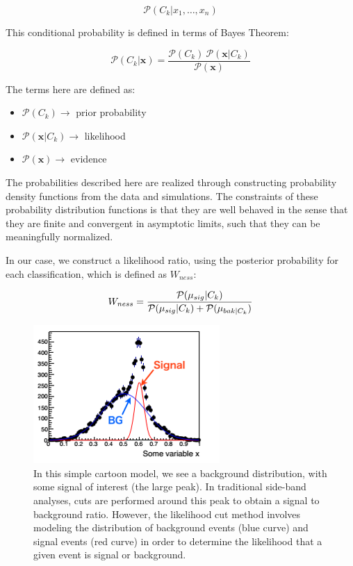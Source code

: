 \begin{equation}
	\label{eq:cond_probabilty}
  \mathcal{P}(C_k \vert x_1, \dots, x_n)
\end{equation}

This conditional probability is defined in terms of Bayes Theorem:

\begin{equation}
	\label{eq:bayes_theorm}
  \mathcal{P}(C_k \vert \mathbf{x}) = \frac{\mathcal{P}(C_k) \
  \mathcal{P}(\mathbf{x} \vert C_k)}{\mathcal{P}(\mathbf{x})}
\end{equation}

The terms here are defined as:
\begin{itemize}
  \item $\mathcal{P}(C_k)\rightarrow$ prior probability
	\item $\mathcal{P}(\mathbf{x} \vert C_k)\rightarrow$ likelihood
	\item $\mathcal{P}(\mathbf{x})\rightarrow$ evidence
\end{itemize}

The probabilities described here are realized through constructing probability
density functions from the data and simulations. The constraints of these
probability distribution functions is that they are well behaved in the sense
that they are finite and convergent in asymptotic limits, such that they can be
meaningfully normalized.

In our case, we construct a likelihood ratio, using the posterior probability
for each classification, which is defined as $W_{ness}$:

\begin{equation}
  W_{ness} = { 
  {
    \mathcal{P}(\mu_{sig}\vert C_k)} 
    \over 
    {\mathcal{P}(\mu_{sig}\vert C_k)+\mathcal{P}(\mu_{bak\vert C_k})} 
  }
\end{equation}

\begin{figure}[ht]
  \centering
  \includegraphics[width=0.6\linewidth]{./figures/likelihood_event_selection.png}
  \caption{
    In this simple cartoon model, we see a background distribution, with some
    signal of interest (the large peak). In traditional side-band analyses, cuts
    are performed around this peak to obtain a signal to background ratio.
    However, the likelihood cut method involves modeling the distribution of
    background events (blue curve) and signal events (red curve) in order to
    determine the likelihood that a given event is signal or background.
  }
  \label{fig:simple_likelihood_event_selection}
\end{figure}

